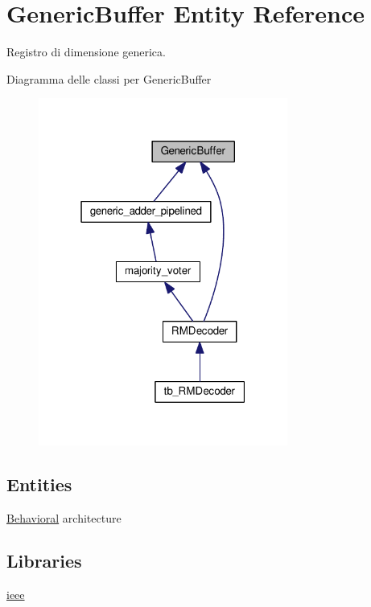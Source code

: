 \hypertarget{class_generic_buffer}{\section{Generic\+Buffer Entity Reference}
\label{class_generic_buffer}
}


Registro di dimensione generica.  




Diagramma delle classi per Generic\+Buffer\nopagebreak
\begin{figure}[H]
\begin{center}
\leavevmode
\includegraphics[width=232pt]{class_generic_buffer__inherit__graph}
\end{center}
\end{figure}
\subsection*{Entities}
\begin{DoxyCompactItemize}
\item 
\hyperlink{class_generic_buffer_1_1_behavioral}{Behavioral} architecture
\end{DoxyCompactItemize}
\subsection*{Libraries}
 \begin{DoxyCompactItemize}
\item 
\hyperlink{class_generic_buffer_a0a6af6eef40212dbaf130d57ce711256}{ieee} 
\end{DoxyCompactItemize}
